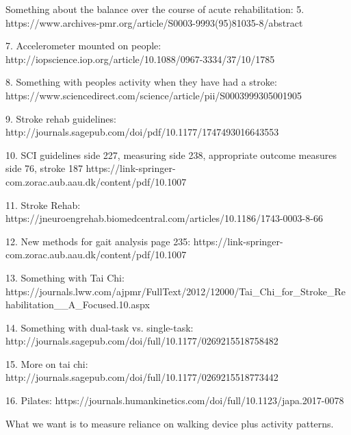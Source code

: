Something about the balance over the course of acute rehabilitation: 5. https://www.archives-pmr.org/article/S0003-9993(95)81035-8/abstract

7. Accelerometer mounted on people: http://iopscience.iop.org/article/10.1088/0967-3334/37/10/1785

8. Something with peoples activity when they have had a stroke: https://www.sciencedirect.com/science/article/pii/S0003999305001905

9. Stroke rehab guidelines: http://journals.sagepub.com/doi/pdf/10.1177/1747493016643553

10. SCI guidelines side 227, measuring side 238, appropriate outcome measures side 76, stroke 187 https://link-springer-com.zorac.aub.aau.dk/content/pdf/10.1007%

11. Stroke Rehab:
https://jneuroengrehab.biomedcentral.com/articles/10.1186/1743-0003-8-66

12. New methods for gait analysis page 235:
https://link-springer-com.zorac.aub.aau.dk/content/pdf/10.1007%

13. Something with Tai Chi:
https://journals.lww.com/ajpmr/FullText/2012/12000/Tai_Chi_for_Stroke_Rehabilitation__A_Focused.10.aspx 

14. Something with dual-task vs. single-task:
http://journals.sagepub.com/doi/full/10.1177/0269215518758482

15. More on tai chi:
http://journals.sagepub.com/doi/full/10.1177/0269215518773442

16. Pilates:
https://journals.humankinetics.com/doi/full/10.1123/japa.2017-0078

What we want is to measure reliance on walking device plus activity patterns.